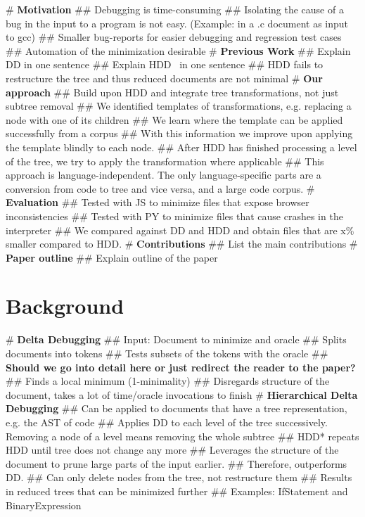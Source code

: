 \documentclass[numbers]{sigplanconf}
\begin{document}
\begin{easylist}[itemize]
# \textbf{Motivation}
## Debugging is time-consuming
## Isolating the cause of a bug in the input to a program is not easy. (Example: in a .c document as input to gcc)
## Smaller bug-reports for easier debugging and regression test cases
## Automation of the minimization desirable
# \textbf{Previous Work}
## Explain DD in one sentence
## Explain HDD~\cite{hdd} in one sentence
## HDD fails to restructure the tree and thus reduced documents are not minimal
# \textbf{Our approach}
## Build upon HDD and integrate tree transformations, not just subtree removal
## We identified templates of transformations, e.g. replacing a node with one of its children
## We learn where the template can be applied successfully from a corpus
## With this information we improve upon applying the template blindly to each node.
## After HDD has finished processing a level of the tree, we try to apply the transformation where applicable
## This approach is language-independent. The only language-specific parts are a conversion from code to tree and vice versa, and a large code corpus.
# \textbf{Evaluation}
## Tested with JS to minimize files that expose browser inconsistencies
## Tested with PY to minimize files that cause crashes in the interpreter
## We compared against DD and HDD and obtain files that are x\% smaller compared to HDD.
# \textbf{Contributions}
## List the main contributions
# \textbf{Paper outline}
## Explain outline of the paper
\end{easylist}

\section{Background}
\label{sec_background}

\begin{easylist}[itemize]
# \textbf{Delta Debugging}
## Input: Document to minimize and oracle
## Splits documents into tokens
## Tests subsets of the tokens with the oracle
## \textbf{Should we go into detail here or just redirect the reader to the paper?}
## Finds a local minimum (1-minimality)
## Disregards structure of the document, takes a lot of time/oracle invocations to finish
# \textbf{Hierarchical Delta Debugging}
## Can be applied to documents that have a tree representation, e.g. the AST of code
## Applies DD to each level of the tree successively. Removing a node of a level means removing the whole subtree
## HDD* repeats HDD until tree does not change any more
## Leverages the structure of the document to prune large parts of the input earlier.
## Therefore, outperforms DD.
## Can only delete nodes from the tree, not restructure them
## Results in reduced trees that can be minimized further
## Examples: IfStatement and BinaryExpression
\end{easylist}
\end{document}
